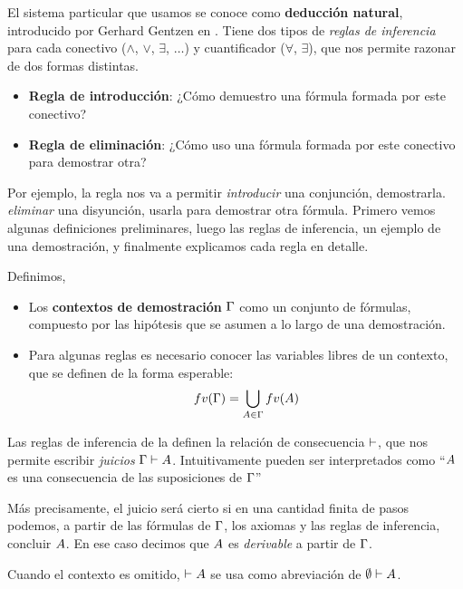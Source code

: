 El sistema particular que usamos se conoce como \textbf{deducción natural},
introducido por Gerhard Gentzen en \cite{gentzen-1935}. Tiene dos tipos de
\textit{reglas de inferencia} para cada conectivo ($\wedge$, $\vee$, $\exists$,
$\dots$) y cuantificador ($\forall$, $\exists$), que nos permite razonar de dos formas distintas.

\begin{itemize}
    \item \textbf{Regla de introducción}: ¿Cómo demuestro una fórmula formada por este conectivo?
    \item \textbf{Regla de eliminación}: ¿Cómo uso una fórmula formada por este conectivo para demostrar otra?
\end{itemize}

Por ejemplo, la regla  nos va a permitir \textit{introducir} una conjunción, demostrarla.  \textit{eliminar} una disyunción, usarla para demostrar otra fórmula. Primero vemos algunas definiciones preliminares, luego las reglas de inferencia, un ejemplo de una demostración, y finalmente explicamos cada regla en detalle.

\begin{definition}
    Definimos,
    \begin{itemize}
        \item Los \textbf{contextos de demostración} $\Gamma$ como un conjunto de fórmulas, compuesto por las hipótesis que se asumen a lo largo de una demostración.
        \item Para algunas reglas es necesario conocer las variables libres de un contexto, que se definen de la forma esperable:
        \[
            fv(\Gamma) = \bigcup_{A \in \Gamma} fv(A)
        \]
    \end{itemize}
\end{definition}

\begin{definition}
    Las reglas de inferencia de la  definen la relación de consecuencia $\vdash$, que nos permite escribir \textit{juicios} $\Gamma \vdash A$. Intuitivamente pueden ser interpretados como ``$A$ es una consecuencia de las suposiciones de $\Gamma$''

    Más precisamente, el juicio será cierto si en una cantidad finita de pasos
    podemos, a partir de las fórmulas de $\Gamma$, los axiomas y las reglas de
    inferencia, concluir $A$. En ese caso decimos que $A$ es
    \textit{derivable} a partir de $\Gamma$.
    
    Cuando el contexto es omitido, $\vdash A$ se usa como abreviación de
    $\emptyset \vdash A$.
\end{definition}

